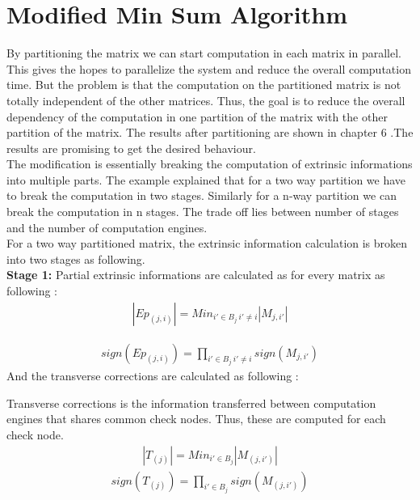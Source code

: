 \section{ Modified Min Sum Algorithm }

By partitioning the matrix we can start computation in each matrix in parallel. This gives the hopes to parallelize the system and reduce the overall computation time. But the problem is that the computation on the partitioned matrix is not totally independent of the other matrices. Thus, the goal is to reduce the overall dependency of the computation in one partition of the matrix with the other partition of the matrix. The results after partitioning are shown in chapter 6 .The results are promising to get the desired behaviour. \\

The modification is essentially breaking the computation of extrinsic informations into multiple parts. The example explained that for a two way partition we have to break the computation in two stages. Similarly for a n-way partition we can break the computation in n stages. The trade off lies between number of stages and the number of computation engines. \\

For a two way partitioned matrix, the extrinsic information calculation is broken into two stages as following.
\\
\textbf{Stage 1:}
Partial extrinsic informations are calculated as for every matrix as following :
\begin{align}
|Ep_{(j,i)}| =  Min_{i'\in B_j \ i'\neq i }|M_{j,i'}|                                                                 
\end{align} 

\begin{align}
 sign({Ep_{(j,i)}}) =  \prod_{i'\in B_j \ i'\neq i }sign(M_{j,i'})  
\end{align} 
And the transverse corrections are calculated as following :

Transverse corrections is the information transferred between computation engines that shares common check nodes. Thus, these are computed for each check node. 
\begin{align} |T_{(j)}| =  Min_{i'\in B_j }|M_{(j,i')}|  
\end{align}  
\begin{align} sign({T_{(j)}}) =  \prod_{i'\in B_j}sign(M_{(j,i')})  
\end{align} 
 
